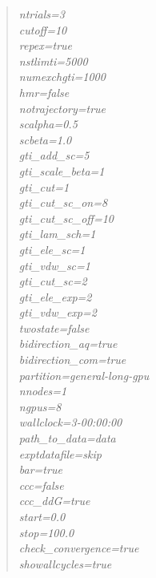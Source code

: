 \documentclass[11pt,letterpaper,titlepage]{article}
\newenvironment{itquote}
  {\begin{quote}\itshape}
  {\end{quote}\ignorespacesafterend}
\begin{document}
\begin{itquote}
{ntrials=3					\\

cutoff=10               			\\
repex=true 					\\
nstlimti=5000           			\\
numexchgti=1000         			\\
hmr=false 					\\
notrajectory=true				\\
scalpha=0.5             			\\
scbeta=1.0              			\\
gti\_add\_sc=5 					\\
gti\_scale\_beta=1      			\\
gti\_cut=1              			\\
gti\_cut\_sc\_on=8      			\\
gti\_cut\_sc\_off=10    			\\
gti\_lam\_sch=1         			\\
gti\_ele\_sc=1          			\\
gti\_vdw\_sc=1          			\\
gti\_cut\_sc=2          			\\
gti\_ele\_exp=2         			\\
gti\_vdw\_exp=2         			\\

twostate=false 					\\
bidirection\_aq=true 				\\
bidirection\_com=true 				\\

partition=general-long-gpu       		\\
nnodes=1                        		\\
ngpus=8                        			\\
wallclock=3-00:00:00          			\\

path\_to\_data=data 				\\
exptdatafile=skip 				\\
bar=true 					\\
ccc=false 					\\
ccc\_ddG=true 					\\
start=0.0 					\\
stop=100.0 					\\
check\_convergence=true 			\\
showallcycles=true 				\\

}

\end{itquote}
\end{document}
